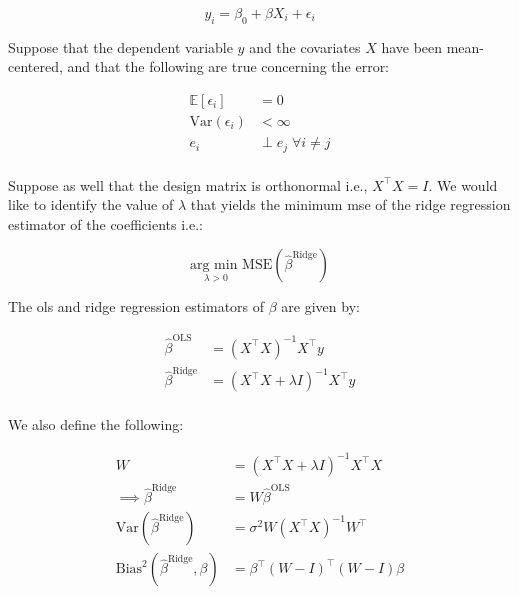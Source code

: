 \documentclass{report}
\begin{document}
\begin{equation}\label{eq:ex-ridge-model-form}
    y_i = \beta_0 + \beta X_i + \epsilon_i
\end{equation}

Suppose that the dependent variable $y$ and the covariates $X$ have been mean-centered, and that the following are true concerning the error:

\begin{equation}\label{eq:ex-ridge-model-assumptions}
    \begin{aligned}
        \mathbb{E}[\epsilon_i] &= 0 \\
        \text{Var}(\epsilon_i) &< \infty \\
        e_i &\perp e_j\; \forall i \neq j \\
    \end{aligned}
\end{equation}

Suppose as well that the design matrix is orthonormal i.e., $X^\intercal X = I$. We would like to identify the value of $\lambda$ that yields the minimum \gls{mse} of the ridge regression estimator of the coefficients i.e.:

\begin{equation}\label{eq:ex-ridge-minimization-problem}
    \underset{\lambda>0}{\text{arg min }}\text{MSE}\left(\hat{\beta}^{\text{Ridge}}\right)
\end{equation}

The \gls{ols} and ridge regression estimators of $\beta$ are given by:

\begin{equation}\label{eq:ex-ridge-beta-ests}
    \begin{aligned}
        \hat{\beta}^{\text{OLS}} &= \left(X^\intercal X\right)^{-1} X^\intercal y \\
        \hat{\beta}^{\text{Ridge}} &= \left(X^\intercal X + \lambda I\right)^{-1} X^\intercal y \\
    \end{aligned}
\end{equation}

We also define the following:

\begin{equation}\label{eq:ex-ridge-beta-ridge-properties}
    \begin{aligned}
        W &= \left(X^\intercal X + \lambda I\right)^{-1} X^\intercal X \\
        \implies \hat{\beta}^{\text{Ridge}} &= W \hat{\beta}^{\text{OLS}} \\
        \text{Var}\left(\hat{\beta}^{\text{Ridge}}\right) &= \sigma^2 W\left(X^\intercal X\right)^{-1} W^\intercal \\
        \text{Bias}^2\left(\hat{\beta}^{\text{Ridge}}, \beta\right) &= \beta^\intercal (W - I)^\intercal (W - I) \beta \\
    \end{aligned}
\end{equation}
\end{document}
